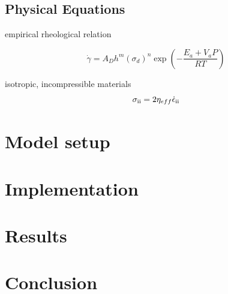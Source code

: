 \documentclass[12pt]{scrartcl}
\newcommand{\RN}[1]{%
  \textup{\uppercase\expandafter{\romannumeral#1}}%
}
\begin{document}
\subsection{Physical Equations}

empirical rheological relation

\begin{equation}
\dot{\gamma}=A_D h^m (\sigma_d)^n\exp\left( -\frac{E_a+V_a P}{RT} \right)
\label{eq:emprheolrel}
\end{equation}

isotropic, incompressible materials
\begin{equation}
\sigma_{\RN{2}} = 2 \eta_{eff}\dot{\epsilon}_{\RN{2}}
\end{equation}

\section{Model setup}

\section{Implementation}
\section{Results}
\section{Conclusion}

\nocite{vargas2013tearing}
\nocite{gerya2009introduction}




\newpage



\end{document}
